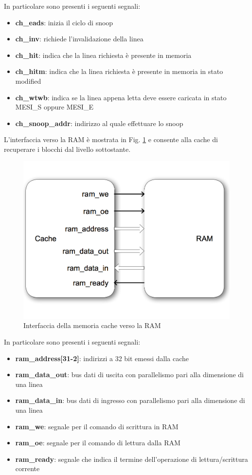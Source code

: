 In particolare sono presenti i seguenti segnali:
\begin{itemize}
\item \textbf{ch\_eads}: inizia il ciclo di snoop
\item \textbf{ch\_inv}: richiede l'invalidazione della linea
\item \textbf{ch\_hit}: indica che la linea richiesta \`e presente in memoria
\item \textbf{ch\_hitm}: indica che la linea richiesta \`e presente in memoria in stato modified
\item \textbf{ch\_wtwb}: indica se la linea appena letta deve essere caricata in stato MESI\_S oppure MESI\_E
\item \textbf{ch\_snoop\_addr}: indirizzo al quale effettuare lo snoop
\end{itemize}


L'interfaccia verso la RAM \`e mostrata in Fig. \ref{fig:int_ram} e consente alla cache di recuperare i blocchi dal livello sottostante.\\

\begin{figure}[h!]
\centering
\includegraphics[width=\textwidth]{img/cache/ram.png}
\caption{Interfaccia della memoria cache verso la RAM}
\label{fig:int_ram}
\end{figure}

In particolare sono presenti i seguenti segnali:
\begin{itemize} %
\item \textbf{ram\_address[31-2]}: indirizzi a 32 bit emessi dalla cache
\item \textbf{ram\_data\_out}: bus dati di uscita con parallelismo pari alla dimensione di una linea
\item \textbf{ram\_data\_in}: bus dati di ingresso con parallelismo pari alla dimensione di una linea
\item \textbf{ram\_we}: segnale per il comando di scrittura in RAM
\item \textbf{ram\_oe}: segnale per il comando di lettura dalla RAM
\item \textbf{ram\_ready}: segnale che indica il termine dell'operazione di lettura/scrittura corrente
\end{itemize}

